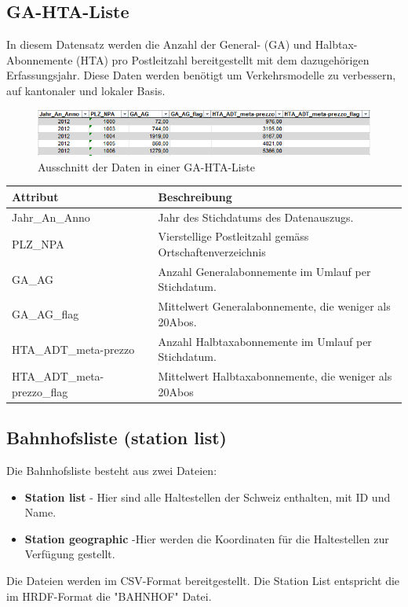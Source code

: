\subsection{GA-HTA-Liste}
\label{GA-HTA-Liste}
In diesem Datensatz werden die Anzahl der General- (GA) und Halbtax-Abonnemente (HTA) pro Postleitzahl bereitgestellt mit dem dazugehörigen Erfassungsjahr. Diese Daten werden benötigt um Verkehrsmodelle zu verbessern, auf kantonaler und lokaler Basis.

\begin{figure}[]
	\centering
	\includegraphics[width=12cm]{img/bspGA-HTA-Liste.png}
	\caption{Ausschnitt der Daten in einer GA-HTA-Liste  \cite{gahtaliste}}
	\label{fig:Beispiel GA-HTA-Liste}
\end{figure}
\begin{tabular}{|l|l|}  \hline
	Attribut & Beschreibung \\ \hline
	Jahr\_An\_Anno & Jahr des Stichdatums des Datenauszugs.  \\ \hline
	PLZ\_NPA & Vierstellige Postleitzahl gemäss Ortschaftenverzeichnis \\ \hline
	GA\_AG & Anzahl Generalabonnemente im Umlauf per Stichdatum. \\ \hline
	GA\_AG\_flag & Mittelwert Generalabonnemente, die weniger als 20Abos. \\ \hline
	HTA\_ADT\_meta-prezzo & Anzahl Halbtaxabonnemente im Umlauf per Stichdatum. \\ \hline	
	HTA\_ADT\_meta-prezzo\_flag & Mittelwert Halbtaxabonnemente, die weniger als 20Abos \\ \hline
\end{tabular}


\subsection{Bahnhofsliste (station list)}
\label{Bahnhofsliste}
Die Bahnhofsliste besteht aus zwei Dateien:
\begin{itemize}
	\item{\textbf{Station list}} - Hier sind alle Haltestellen der Schweiz enthalten, mit ID und Name.   
	\item{\textbf{Station geographic}} -Hier werden die Koordinaten für die Haltestellen zur Verfügung gestellt.
\end{itemize}
Die Dateien werden im CSV-Format bereitgestellt.
Die Station List entspricht die im HRDF-Format die "BAHNHOF"  Datei.\cite{bahnhofsliste}

